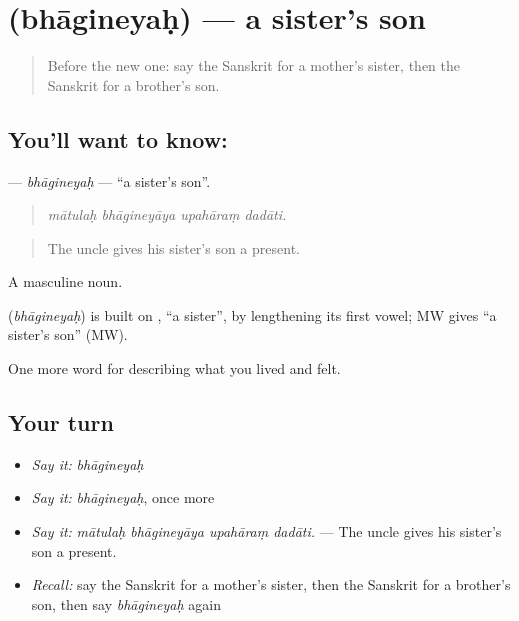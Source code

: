 \section[\texorpdfstring{\sk{भागिनेयः} (bhāgineyaḥ)}{भागिनेयः (bhāgineyaḥ)}]{ (bhāgineyaḥ) — a sister's son}

\label{lesson:SA-C499-bhagineyah}



\begin{quote}
Before the new one: say the Sanskrit for a mother's sister, then the Sanskrit for a brother's son.
\end{quote}

\subsection*{You'll want to know: }
\textbf{} — \emph{bhāgineyaḥ} — \textquotedblleft{}a sister's son\textquotedblright{}.

\begin{quote}
   
\end{quote}

\begin{quote}
\emph{mātulaḥ bhāgineyāya upahāraṃ dadāti.}
\end{quote}

\begin{quote}
The uncle gives his sister's son a present.
\end{quote}

A masculine noun.

\begin{cousinweb}
\textbf{} (\emph{bhāgineyaḥ}) is built on \textbf{}, \textquotedblleft{}a sister\textquotedblright{}, by lengthening its first vowel; MW gives \textquotedblleft{}a sister's son\textquotedblright{} (MW).
\end{cousinweb}

\begin{grammarlens}[title={What you've built}]
One more word for describing what you lived and felt.
\end{grammarlens}

\subsection*{Your turn}
\begin{itemize}
\raggedright
  \item \emph{Say it:} \emph{bhāgineyaḥ}
  \item \emph{Say it:} \emph{bhāgineyaḥ}, once more
  \item \emph{Say it:} \emph{mātulaḥ bhāgineyāya upahāraṃ dadāti.} — The uncle gives his sister's son a present.
  \item \emph{Recall:} say the Sanskrit for a mother's sister, then the Sanskrit for a brother's son, then say \emph{bhāgineyaḥ} again
\end{itemize}

